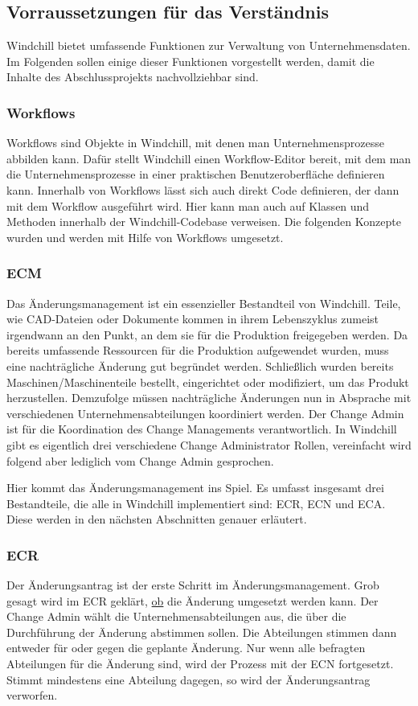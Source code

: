 \subsection{Vorraussetzungen für das Verständnis}

Windchill bietet umfassende Funktionen zur Verwaltung von Unternehmensdaten.
Im Folgenden sollen einige dieser Funktionen vorgestellt werden, damit die Inhalte des Abschlussprojekts nachvollziehbar sind.

\subsubsection{Workflows}
Workflows sind Objekte in Windchill, mit denen man Unternehmensprozesse abbilden kann.
Dafür stellt Windchill einen Workflow-Editor bereit, mit dem man die Unternehmensprozesse in einer praktischen Benutzeroberfläche definieren kann.
Innerhalb von Workflows lässt sich auch direkt Code definieren, der dann mit dem Workflow ausgeführt wird.
Hier kann man auch auf Klassen und Methoden innerhalb der Windchill-Codebase verweisen.
Die folgenden Konzepte wurden und werden mit Hilfe von Workflows umgesetzt.

\subsubsection{\acl{ECM}}
\label{sec:ECM}
Das Änderungsmanagement ist ein essenzieller Bestandteil von Windchill.
Teile, wie \zB CAD-Dateien oder Dokumente kommen in ihrem Lebenszyklus zumeist irgendwann an den Punkt, an dem sie für die Produktion freigegeben werden.
Da bereits umfassende Ressourcen für die Produktion aufgewendet wurden, muss eine nachträgliche Änderung gut begründet werden.
Schließlich wurden bereits Maschinen/Maschinenteile bestellt, eingerichtet oder modifiziert, um das Produkt herzustellen.
Demzufolge müssen nachträgliche Änderungen nun in Absprache mit verschiedenen Unternehmensabteilungen koordiniert werden.
Der Change Admin ist für die Koordination des Change Managements verantwortlich.
In Windchill gibt es eigentlich drei verschiedene Change Administrator Rollen, vereinfacht wird folgend aber lediglich vom Change Admin gesprochen.

Hier kommt das Änderungsmanagement ins Spiel.
Es umfasst insgesamt drei Bestandteile, die alle in Windchill implementiert sind: \acl{ECR}, \acl{ECN} und \acl{ECA}.
Diese werden in den nächsten Abschnitten genauer erläutert.

\subsubsection{\acl{ECR}}
Der Änderungsantrag ist der erste Schritt im Änderungsmanagement.
Grob gesagt wird im \ac{ECR} geklärt, \underline{ob} die Änderung umgesetzt werden kann.
Der Change Admin wählt die Unternehmensabteilungen aus, die über die Durchführung der Änderung abstimmen sollen.
Die Abteilungen stimmen dann entweder für oder gegen die geplante Änderung.
Nur wenn alle befragten Abteilungen für die Änderung sind, wird der Prozess mit der \ac{ECN} fortgesetzt.
Stimmt mindestens eine Abteilung dagegen, so wird der Änderungsantrag verworfen.

